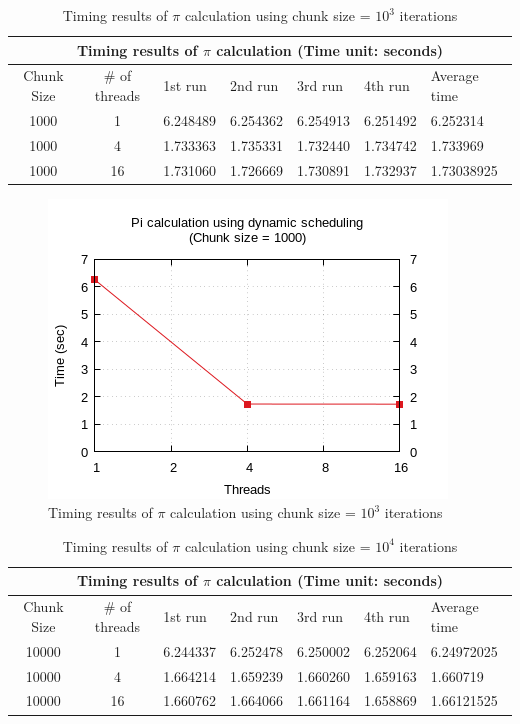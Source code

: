 \documentclass{article}
\begin{document}

\begin{table}[htbp]
  \centering
    \begin{tabular}{|c c||l l l l| l|} 
    \hline
    \multicolumn{7}{|c|}{Timing results of $\pi$ calculation (Time unit: seconds)} \\
    \hline
    Chunk Size & \# of threads & 1st run & 2nd run & 3rd run & 4th run & Average time\\ [0.5ex] 
    \hline\hline
    1000 & 1 & 6.248489 & 6.254362 & 6.254913 & 6.251492 & 6.252314 \\
    \hline
    1000 & 4 & 1.733363 & 1.735331 & 1.732440 & 1.734742 & 1.733969 \\
    \hline
    1000 & 16 & 1.731060 & 1.726669 & 1.730891 & 1.732937 & 1.73038925 \\ [1ex]
    \hline
    \end{tabular}
  \caption{Timing results of $\pi$ calculation using chunk size = $10^3$ iterations}
\end{table}

\begin{figure}[htbp]
  \centering
  \includegraphics[width=0.55\columnwidth]{../../hw1/ex1/plots/pi_c1000.png}
  \caption{Timing results of $\pi$ calculation using chunk size = $10^3$ iterations}
\end{figure}



\begin{table}[htbp]
  \centering
    \begin{tabular}{|c c||l l l l| l|} 
    \hline
    \multicolumn{7}{|c|}{Timing results of $\pi$ calculation (Time unit: seconds)} \\
    \hline
    Chunk Size & \# of threads & 1st run & 2nd run & 3rd run & 4th run & Average time\\ [0.5ex] 
    \hline\hline
    10000 & 1 & 6.244337 & 6.252478 & 6.250002 & 6.252064 & 6.24972025 \\
    \hline
    10000 & 4 & 1.664214 & 1.659239 & 1.660260 & 1.659163 & 1.660719 \\
    \hline
    10000 & 16 & 1.660762 & 1.664066 & 1.661164 & 1.658869 & 1.66121525 \\ [1ex]
    \hline
    \end{tabular}
  \caption{Timing results of $\pi$ calculation using chunk size = $10^4$ iterations}
\end{table}
\end{document}
